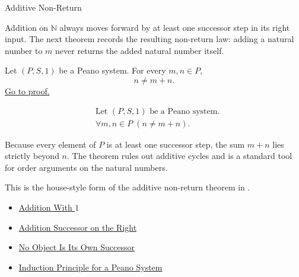 \begin{topicbox}{Additive Non-Return}
\begin{exposition}
Addition on $\mathbb{N}$ always moves forward by at least one successor step
in its right input. The next theorem records the resulting non-return law:
adding a natural number to $m$ never returns the added natural number itself.
\end{exposition}

\begin{tcolorbox}[colback=thmbox, colframe=thmborder, arc=2pt,
  left=6pt, right=6pt, top=4pt, bottom=4pt,
  title={\small\textbf{Theorem (No Natural Number Equals Itself Plus a Natural Number)}},
  fonttitle=\small\bfseries]
\begin{theorem}
\label{thm:no-natural-number-equals-itself-plus-a-natural-number}
Let $(P,S,1)$ be a Peano system. For every $m,n \in P$,
\[
n \neq m+n.
\]
\hyperref[prf:no-natural-number-equals-itself-plus-a-natural-number]{Go to proof.}
\end{theorem}
\end{tcolorbox}

\begin{remark*}
\[
\begin{aligned}
&\text{Let } (P,S,1) \text{ be a Peano system.}\\
&\forall m,n \in P\;(n \neq m+n).
\end{aligned}
\]
\end{remark*}

\begin{remark*}[Interpretation]
Because every element of $P$ is at least one successor step, the sum $m+n$
lies strictly beyond $n$. The theorem rules out additive cycles and is a
standard tool for order arguments on the natural numbers.
\end{remark*}

\begin{remark*}
This is the house-style form of the additive non-return theorem in
\citep{FefermanNumberSystems1964}.
\end{remark*}

\begin{dependencies}
\begin{itemize}
  \item \hyperref[thm:addition-with-one]{Addition With $1$}
  \item \hyperref[thm:addition-successor-on-right]{Addition Successor on the Right}
  \item \hyperref[thm:no-object-is-its-own-successor]{No Object Is Its Own Successor}
  \item \hyperref[thm:induction-principle-for-peano-system]{Induction Principle for a Peano System}
\end{itemize}
\end{dependencies}
\end{topicbox}
